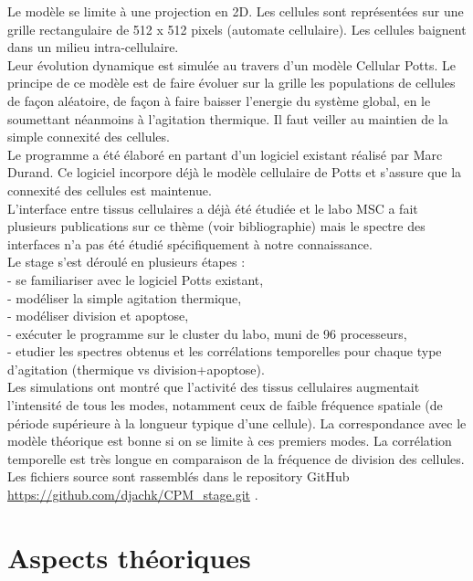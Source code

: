 \documentclass[11pt,a4paper]{article}
\begin{document}
Le modèle se limite à une projection en 2D. Les cellules sont représentées sur une grille rectangulaire de 512 x 512 pixels (automate cellulaire). Les cellules baignent dans un milieu intra-cellulaire.\\
Leur évolution dynamique est simulée au travers d’un modèle Cellular Potts. Le principe de ce modèle est de faire évoluer sur la grille les populations de cellules de façon aléatoire, de façon à faire baisser l'energie du système global, en le soumettant néanmoins à l'agitation thermique. Il faut veiller au maintien de la simple connexité des cellules.\\

Le programme a été élaboré en partant d’un logiciel existant réalisé par Marc Durand. Ce logiciel incorpore déjà le modèle cellulaire de Potts et s’assure que la connexité des cellules est maintenue.\\

L'interface entre tissus cellulaires a déjà été étudiée et le labo MSC a fait plusieurs publications sur ce thème (voir bibliographie) mais le spectre des interfaces n'a pas été étudié spécifiquement à notre connaissance.\\

Le stage s'est déroulé en plusieurs étapes :\\
- se familiariser avec le logiciel Potts existant,\\
- modéliser la simple agitation thermique, \\
- modéliser division et apoptose, \\
- exécuter le programme sur le cluster du labo, muni de 96 processeurs, \\
- etudier les spectres obtenus et les corrélations temporelles pour chaque type d'agitation (thermique vs division+apoptose).\\

Les simulations ont montré que l'activité des tissus cellulaires augmentait l'intensité de tous les modes, notamment ceux de faible fréquence spatiale (de période supérieure à la longueur typique d'une cellule). La correspondance avec le modèle théorique est bonne si on se limite à ces premiers modes. La corrélation temporelle est très longue en comparaison de la fréquence de division des cellules.\\

Les fichiers source sont rassemblés dans le repository GitHub \url{https://github.com/djachk/CPM_stage.git} .


\section{Aspects théoriques}
\end{document}
